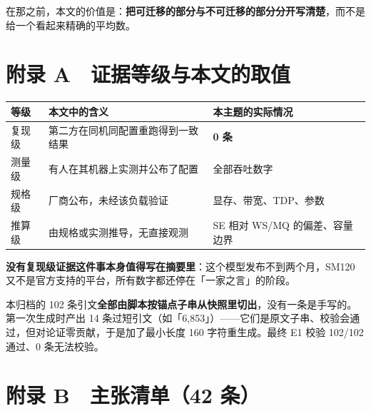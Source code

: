 在那之前，本文的价值是：\textbf{把可迁移的部分与不可迁移的部分分开写清楚}，而不是给一个看起来精确的平均数。



\section{附录 A　证据等级与本文的取值}

\begin{table}[t]
\centering
\footnotesize
\setlength{\tabcolsep}{4pt}
\label{tab:18}
\begin{tabular}{lll}
\toprule
等级 & 本文中的含义 & 本主题的实际情况 \\
\midrule
复现级 & 第二方在同机同配置重跑得到一致结果 & \textbf{0 条} \\
测量级 & 有人在其机器上实测并公布了配置 & 全部吞吐数字 \\
规格级 & 厂商公布，未经该负载验证 & 显存、带宽、TDP、参数 \\
推算级 & 由规格或实测推导，无直接观测 & SE 相对 WS/MQ 的偏差、容量边界 \\
\bottomrule
\end{tabular}
\end{table}

\textbf{没有复现级证据这件事本身值得写在摘要里}：这个模型发布不到两个月，SM120 又不是官方支持的平台，所有数字都还停在「一家之言」的阶段。


本归档的 102 条引文\textbf{全部由脚本按锚点子串从快照里切出}，没有一条是手写的。第一次生成时产出 14 条过短引文（如「6,853」）——它们是原文子串、校验会通过，但对论证零贡献，于是加了最小长度 160 字符重生成。最终 E1 校验 102/102 通过、0 条无法校验。


\section{附录 B　主张清单（42 条）}

